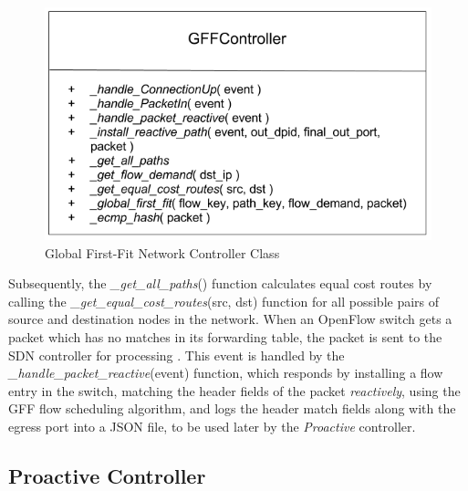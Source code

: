 \begin{figure}[!ht] 
	\centerline{\includegraphics[scale=0.42]{graphics/chapter5/GFFClass.png}}
	\caption{Global First-Fit Network Controller Class}
	\label{fig:GFFClass}
\end{figure}

Subsequently, the \textit{\_get\_all\_paths}() function calculates equal cost routes by calling the \textit{\_get\_equal\_cost\_routes}(src, dst) function for all possible pairs of source and destination nodes in the network. When an OpenFlow switch gets a packet which has no matches in its forwarding table, the packet is sent to the SDN controller for processing \cite{mckeown2008openflow}. This event is handled by the \textit{\_handle\_packet\_reactive}(event) function, which responds by installing a flow entry in the switch, matching the header fields of the packet \textit{reactively}, using the GFF flow scheduling algorithm, and logs the header match fields along with the egress port into a JSON file, to be used later by the \textit{Proactive} controller. 

\subsection{Proactive Controller}


